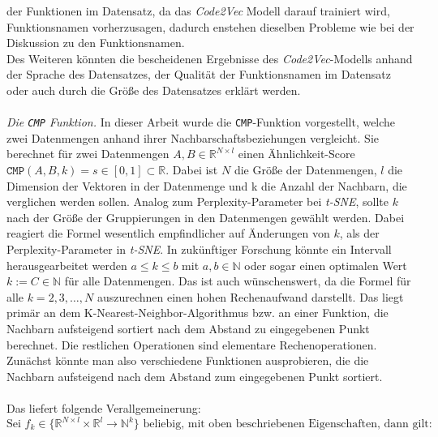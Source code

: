 \documentclass[12pt,letterpaper,ngerman]{article}
\begin{document}
der Funktionen im Datensatz, da das \textit{Code2Vec} Modell 
darauf trainiert wird, Funktionsnamen vorherzusagen, dadurch 
enstehen dieselben Probleme wie bei der Diskussion zu 
den Funktionsnamen.\\
Des Weiteren könnten die bescheidenen Ergebnisse des 
\textit{Code2Vec}-Modells anhand der Sprache des Datensatzes,
der Qualität der Funktionsnamen im Datensatz oder auch durch die 
Größe des Datensatzes erklärt werden.\\\\
\textit{Die \texttt{CMP} Funktion.} 
In dieser Arbeit wurde die \texttt{CMP}-Funktion vorgestellt, welche 
zwei Datenmengen anhand ihrer Nachbarschaftsbeziehungen vergleicht.
Sie berechnet für zwei Datenmengen $A,B \in \mathbb{R}^{N\times l}$
einen Ähnlichkeit-Score 
$\texttt{CMP}(A,B,k) = s \in [0,1]\subset \mathbb{R}$.
Dabei ist $N$ die Größe der Datenmengen, $l$ die Dimension der 
Vektoren in der Datenmenge und k die Anzahl der Nachbarn, 
die verglichen werden sollen. Analog zum Perplexity-Parameter
bei \textit{t-SNE}, sollte $k$ nach der Größe der Gruppierungen 
in den Datenmengen gewählt werden. Dabei reagiert die Formel 
wesentlich empfindlicher auf Änderungen von $k$, als der 
Perplexity-Parameter in \textit{t-SNE}. In zukünftiger Forschung 
könnte ein Intervall herausgearbeitet werden $a \le k \le b $ mit
$ a,b \in \mathbb{N}$ oder sogar einen  optimalen Wert 
$k := C\in \mathbb{N}$ für alle Datenmengen.
Das ist auch wünschenswert, da die Formel für 
alle $k = 2,3,\dots, N$ auszurechnen einen hohen Rechenaufwand 
darstellt. Das liegt primär an dem K-Nearest-Neighbor-Algorithmus 
bzw. an einer Funktion, die Nachbarn aufsteigend sortiert nach 
dem Abstand zu eingegebenen Punkt berechnet. Die restlichen 
Operationen sind elementare Rechenoperationen. Zunächst könnte 
man also verschiedene Funktionen ausprobieren, die die Nachbarn 
aufsteigend nach dem Abstand zum eingegebenen Punkt sortiert.
\hfill\\
\pagebreak
\hfill\\
Das liefert folgende Verallgemeinerung:
\[
  \text{Sei  }f_k \in \{\mathbb{R}^{N\times l}
  \times \mathbb{R}^l \to \mathbb{N}^k\} 
  \text{ beliebig, mit oben beschriebenen Eigenschaften, dann gilt:}
\]
\end{document}
